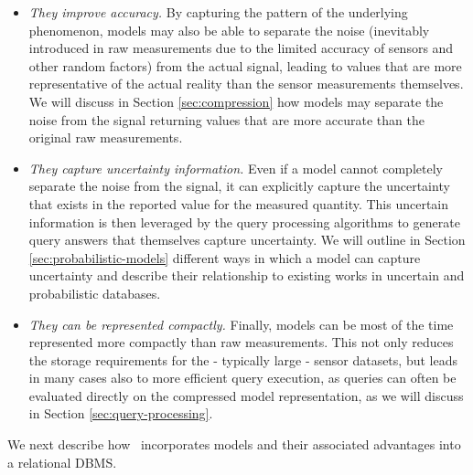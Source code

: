 \begin{itemize}
\item \emph{They improve accuracy.} By capturing the pattern of the underlying phenomenon, models may also be able to separate the noise (inevitably introduced in raw measurements due to the limited accuracy of sensors and other random factors) from the actual signal, leading to values that are more representative of the actual reality than the sensor measurements themselves. We will discuss in Section \ref{sec:compression} how models may separate the noise from the signal returning values that are more accurate than the original raw measurements.
\item \emph{They capture uncertainty information.} Even if a model cannot completely separate the noise from the signal, it can explicitly capture the uncertainty that exists in the reported value for the measured quantity. This uncertain information is then leveraged by the query processing algorithms to generate query answers that themselves capture uncertainty. We will outline in Section \ref{sec:probabilistic-models} different ways in which a model can capture uncertainty and describe their relationship to existing works in uncertain and probabilistic databases.
\item \emph{They can be represented compactly.} Finally, models can be most of the time represented more compactly than raw measurements. This not only reduces the storage requirements for the - typically large - sensor datasets, but leads in many cases also to more efficient query execution, as queries can often be evaluated directly on the compressed model representation, as we will discuss in Section \ref{sec:query-processing}.
\end{itemize}

We next describe how \projName\ incorporates models and their associated advantages into a relational DBMS.

\fi
